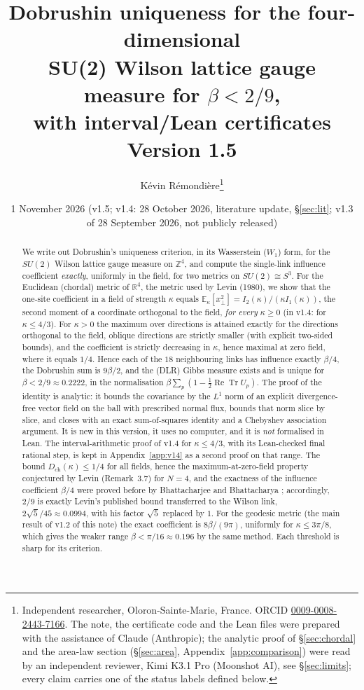 \documentclass[11pt,a4paper]{article}
\title{Dobrushin uniqueness for the four-dimensional\\ SU(2) Wilson lattice gauge measure for $\beta<2/9$,\\
with interval/Lean certificates\\[4pt]
\large Version 1.5}
\author{K\'evin R\'emondi\`ere\thanks{Independent researcher, Oloron-Sainte-Marie, France. ORCID
\href{https://orcid.org/0009-0008-2443-7166}{0009-0008-2443-7166}. The note, the certificate code and the Lean
files were prepared with the assistance of Claude (Anthropic); the analytic proof of \S\ref{sec:chordal} and the area-law
section (\S\ref{sec:area}, Appendix~\ref{app:comparison}) were read by an independent reviewer, Kimi K3.1 Pro (Moonshot AI),
see \S\ref{sec:limits}; every claim carries one of the status labels defined below.}}
\date{1 November 2026 (v1.5; v1.4: 28 October 2026, literature update, \S\ref{sec:lit}; v1.3 of 28 September 2026, not publicly released)}
\theoremstyle{remark}
\theoremstyle{definition}
\theoremstyle{plain}
\theoremstyle{remark}
\newcommand{\R}{\mathbb{R}}
\newcommand{\Z}{\mathbb{Z}}
\newcommand{\E}{\mathbb{E}}
\newcommand{\ReTr}{\operatorname{Re}\operatorname{Tr}}
\newcommand{\Dch}{D_{\mathrm{ch}}}
\begin{document}
\maketitle

\begin{abstract}
We write out Dobrushin's uniqueness criterion, in its Wasserstein ($W_1$) form, for the $SU(2)$ Wilson lattice
gauge measure on $\Z^4$, and compute the single-link influence coefficient \emph{exactly}, uniformly in the
field, for two metrics on $SU(2)\cong S^3$.
For the Euclidean (chordal) metric of $\R^4$, the metric used by Levin (1980), we show that the one-site
coefficient in a field of strength $\kappa$ equals $\E_\kappa[x_\perp^2]=I_2(\kappa)/(\kappa I_1(\kappa))$, the
second moment of a coordinate orthogonal to the field, \emph{for every} $\kappa\ge0$ (in v1.4: for $\kappa\le4/3$).
For $\kappa>0$ the maximum over directions is attained exactly for the directions orthogonal to the field, oblique
directions are strictly smaller (with explicit two-sided bounds), and the coefficient is strictly decreasing in
$\kappa$, hence maximal at zero field, where it equals $1/4$. Hence each of the $18$ neighbouring links has
influence exactly $\beta/4$, the Dobrushin sum is $9\beta/2$, and the (DLR) Gibbs measure exists and is unique
for $\beta<2/9\approx0.2222$, in the normalisation $\beta\sum_p(1-\tfrac12\ReTr U_p)$.
The proof of the identity is analytic: it bounds the covariance by the $L^1$ norm of an explicit divergence-free
vector field on the ball with prescribed normal flux, bounds that norm slice by slice, and closes with an exact
sum-of-squares identity and a Chebyshev association argument. It is new in this version, it uses no computer, and it is
\emph{not} formalised in Lean. The interval-arithmetic proof of v1.4 for $\kappa\le4/3$, with its Lean-checked final
rational step, is kept in Appendix~\ref{app:v14} as a second proof on that range.
The bound $\Dch(\kappa)\le1/4$ for all fields, hence the maximum-at-zero-field property conjectured by Levin
(Remark~3.7) for $N=4$, and the exactness of the influence coefficient $\beta/4$ were proved before by
Bhattacharjee and Bhattacharya \cite{BB26}; accordingly, $2/9$ is exactly Levin's published bound transferred to
the Wilson link, $2\sqrt5/45\approx0.0994$, with his factor $\sqrt5$ replaced by $1$.
For the geodesic metric (the main result of v1.2 of this note) the exact coefficient is $8\beta/(9\pi)$,
uniformly for $\kappa\le3\pi/8$, which gives the weaker range $\beta<\pi/16\approx0.196$ by the same method.
Each threshold is sharp for its criterion.

\end{abstract}
\end{document}
